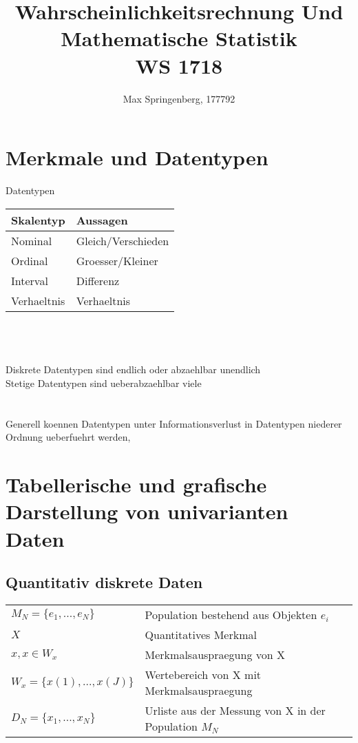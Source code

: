 \documentclass{article}
\author{Max Springenberg, 177792}
\title{
    Wahrscheinlichkeitsrechnung Und Mathematische Statistik\\
    WS 1718
}
\date{}
\newcommand{\gap}{\\ \ \\}
\begin{document}
\maketitle
\section{Merkmale und Datentypen}
Datentypen\\
\begin{tabular}{ll}
    Skalentyp   &Aussagen\\
    \hline
    Nominal     &Gleich/Verschieden\\
    Ordinal     &Groesser/Kleiner\\
    \hline
    Interval    &Differenz\\
    Verhaeltnis &Verhaeltnis\\
\end{tabular}\\
\gap
Diskrete Datentypen sind endlich oder abzaehlbar unendlich\\
Stetige Datentypen sind ueberabzaehlbar viele\\
\gap
Generell koennen Datentypen unter Informationsverlust in Datentypen niederer
Ordnung ueberfuehrt werden,\\
\section{Tabellerische und grafische Darstellung von univarianten Daten}
\subsection{Quantitativ diskrete Daten}
\begin{tabular}{ll}
    $M_N =\{e_1, ..., e_N\}$    &Population bestehend aus Objekten $e_i$\\
    $X$                         &Quantitatives Merkmal\\
    $x,x \in W_x$               &Merkmalsauspraegung von X\\
    $W_x = \{x(1),...,x(J)\}$   &Wertebereich von X mit Merkmalsauspraegung\\
    $D_N = \{x_1,...,x_N\}$     &Urliste aus der Messung von X in der Population $M_N$\\
\end{tabular}
\end{document}
